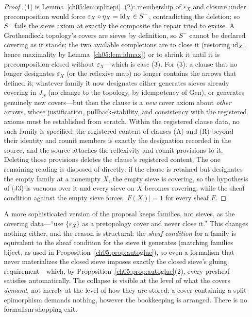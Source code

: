 \begin{proof}
(1) is Lemma~\ref{ch05:lem:splitepi}. (2): membership of $\varepsilon_X$ and
closure under precomposition would force
$\varepsilon_X\circ\eta_X=\mathrm{id}_X\in S^{-}$, contradicting the deletion; so
$S^{-}$ fails the sieve axiom at exactly the composite the repair tried to
excise. A Grothendieck topology's covers are sieves by definition, so
$S^{-}$ cannot be declared covering as it stands; the two available
completions are to close it (restoring $\mathrm{id}_X$, hence maximality by
Lemma~\ref{ch05:lem:idmax}) or to shrink it until it is
precomposition-closed without $\varepsilon_X$---which is case (3). For (3):
a clause that no longer designates $\varepsilon_X$ (or the reflexive map) no
longer contains the arrows that defined it; whatever family it now
designates either generates sieves already covering in $J_{\mathrm{js}}$
(no change to the topology, by idempotency of $\mathrm{Gen}$), or generates
genuinely new covers---but then the clause is a \emph{new} cover axiom about
\emph{other} arrows, whose justification, pullback-stability, and
consistency with the registered axioms must be established from scratch.
Within the registered clause data, no such family is specified; the
registered content of clauses (A) and (R) beyond their identity and counit
members is exactly the designation recorded in the source, and the source
attaches the reflexivity and counit provisions to it. Deleting those
provisions deletes the clause's registered content. The one remaining
reading is disposed of directly: if the clause is retained but designates
the empty family at a nonempty $X$, the empty sieve is covering, so the
hypothesis of (J3) is vacuous over it and every sieve on $X$ becomes
covering, while the sheaf condition against the empty sieve forces
$|F(X)|=1$ for every sheaf $F$.
\end{proof}

\begin{remark}\label{ch05:rem:pretop}
A more sophisticated version of the proposal keeps families, not sieves, as
the covering data---``use $\{\varepsilon_X\}$ as a pretopology cover and
never close it.'' This changes nothing either, and the reason is structural:
the \emph{sheaf condition} for a family is equivalent to the sheaf condition
for the sieve it generates (matching families biject, as used in
Proposition~\ref{ch05:prop:autoglue}), so even a formalism that never
materializes the closed sieve imposes exactly the closed sieve's gluing
requirement---which, by Proposition~\ref{ch05:prop:autoglue}(2), every
presheaf satisfies automatically. The collapse is visible at the level of
what the covers \emph{demand}, not merely at the level of how they are
stored: a cover containing a split epimorphism demands nothing, however the
bookkeeping is arranged. There is no formalism-shopping exit.
\end{remark}

